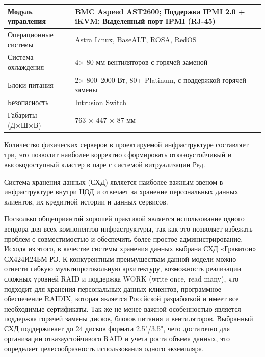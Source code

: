 \documentclass[14pt, a4paper]{extarticle}
\begin{document}
\begin{tabularx}{\textwidth}{|l|X|}
  Модуль управления                    & BMC Aspeed AST2600; Поддержка IPMI 2.0 + iKVM; Выделенный порт IPMI (RJ-45)                                                                                       \\\hline
  Операционные системы                 & Astra Linux, BaseALT, ROSA, RedOS                                                                                                                                 \\\hline
  Система охлаждения                   & 4× 80 мм вентиляторов с горячей заменой                                                                                                                           \\
  Блоки питания                        & 2× 800–2000 Вт, 80+ Platinum, с поддержкой горячей замены                                                                                                         \\\hline
  Безопасность                         & Intrusion Switch                                                                                                                                                  \\\hline
  Габариты (Д×Ш×В)                     & 763 × 447 × 87 мм                                                                                                                                                 \\\hline
\end{tabularx}

Количество физических серверов в проектируемой инфраструктуре составляет три, это позволит
наиболее корректно сформировать отказоустойчивый и высокодоступный кластер в паре с
системой витруализации Ред.

Система хранения данных (СХД) является наиболее важным звеном в инфраструктуре внутри ЦОД
и отвечает за хранение персональных данных клиентов, их кредитной истории и данных сервисов.

Посколько общеприянтой хорошей практикой является использование одного вендора для всех
компонентов инфраструктуры, так как это позволяет избежать проблем с совместимостью и
обеспечить более простое администрирование. Исходя из этого, в качестве системы хранения
данных выбрана СХД «Гравитон» СХ424И24БМ-РЭ. К конкурентным преимуществам данной модели
можно отнести гибкую мультипротокольную архитектуру, возможность реализации сложных
уровней RAID и поддержка WORK (write once, read many), что подходит для хранения
персональных данных клиентов, программное обеспечение RAIDIX, которая является
Россйской разработкой и имеет все необходимые сертификаты. Так же не менее важной
особенностью является поддержка горячей замены дисков, блоков питания и вентиляторов.
Выбранный СХД поддерживает до 24 дисков формата 2.5"/3.5", чего достаточно для организации
отказаустойчивого RAID и учета роста объема данных, это определяет целесообразность
использования одного экземпляра.
\end{document}
